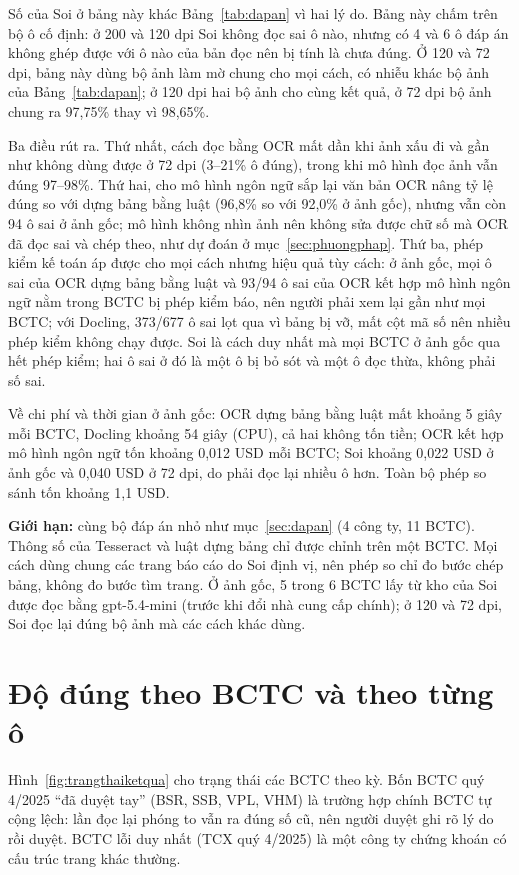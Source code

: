 \documentclass[12pt,a4paper]{report}
\newcommand{\enquote}[1]{“#1”}
\begin{document}
Số của Soi ở bảng này khác Bảng~\ref{tab:dapan} vì hai lý do. Bảng này chấm trên bộ ô cố định: ở 200 và 120 dpi Soi
không đọc sai ô nào, nhưng có 4 và 6 ô đáp án không ghép được với ô nào của bản đọc nên bị tính là chưa đúng. Ở 120 và 72
dpi, bảng này dùng bộ ảnh làm mờ chung cho mọi cách, có nhiễu khác bộ ảnh của Bảng~\ref{tab:dapan}; ở 120 dpi hai bộ ảnh
cho cùng kết quả, ở 72 dpi bộ ảnh chung ra 97,75\% thay vì 98,65\%.

Ba điều rút ra. Thứ nhất, cách đọc bằng OCR mất dần khi ảnh xấu đi và gần như không dùng được ở 72 dpi (3--21\% ô
đúng), trong khi mô hình đọc ảnh vẫn đúng 97--98\%. Thứ hai, cho mô hình ngôn ngữ sắp lại văn bản OCR nâng tỷ lệ đúng
so với dựng bảng bằng luật (96,8\% so với 92,0\% ở ảnh gốc), nhưng vẫn còn 94 ô sai ở ảnh gốc; mô hình không nhìn
ảnh nên không sửa được chữ số mà OCR đã đọc sai và chép theo, như dự đoán ở mục~\ref{sec:phuongphap}. Thứ ba, phép kiểm kế toán áp được cho mọi cách nhưng
hiệu quả tùy cách: ở ảnh gốc, mọi ô sai của OCR dựng bảng bằng luật và 93/94 ô sai của OCR kết hợp mô hình ngôn ngữ nằm
trong BCTC bị phép kiểm báo, nên người phải xem lại gần như mọi BCTC; với Docling, 373/677 ô sai lọt qua vì bảng bị vỡ,
mất cột mã số nên nhiều phép kiểm không chạy được. Soi là cách duy nhất
mà mọi BCTC ở ảnh gốc qua hết phép kiểm; hai ô sai ở đó là một ô bị bỏ sót và một ô đọc thừa, không phải số sai.

Về chi phí và thời gian ở ảnh gốc: OCR dựng bảng bằng luật mất khoảng 5 giây mỗi BCTC, Docling khoảng 54 giây (CPU),
cả hai không tốn tiền; OCR kết hợp mô hình ngôn ngữ tốn khoảng 0,012 USD mỗi BCTC; Soi khoảng 0,022 USD ở ảnh gốc và
0,040 USD ở 72 dpi, do phải đọc lại nhiều ô hơn. Toàn bộ phép so sánh tốn khoảng 1,1 USD.

\textbf{Giới hạn:} cùng bộ đáp án nhỏ như mục~\ref{sec:dapan} (4 công ty, 11 BCTC). Thông số của Tesseract và luật dựng
bảng chỉ được chỉnh trên một BCTC. Mọi cách dùng chung các trang báo cáo do Soi định vị, nên phép so chỉ đo bước chép
bảng, không đo bước tìm trang. Ở ảnh gốc, 5 trong 6 BCTC lấy từ kho của Soi được đọc bằng gpt-5.4-mini (trước khi đổi
nhà cung cấp chính); ở 120 và 72 dpi, Soi đọc lại đúng bộ ảnh mà các cách khác dùng.

\section{Độ đúng theo BCTC và theo từng ô}\label{sec:theoo}
Hình~\ref{fig:trangthaiketqua} cho trạng thái các BCTC theo kỳ. Bốn BCTC quý 4/2025 \enquote{đã duyệt tay} (BSR, SSB,
VPL, VHM) là trường hợp chính BCTC tự cộng lệch: lần đọc lại phóng to vẫn ra đúng số cũ, nên người duyệt ghi rõ lý do
rồi duyệt. BCTC lỗi duy nhất (TCX quý 4/2025) là một công ty chứng khoán có cấu trúc trang khác thường.
\end{document}
